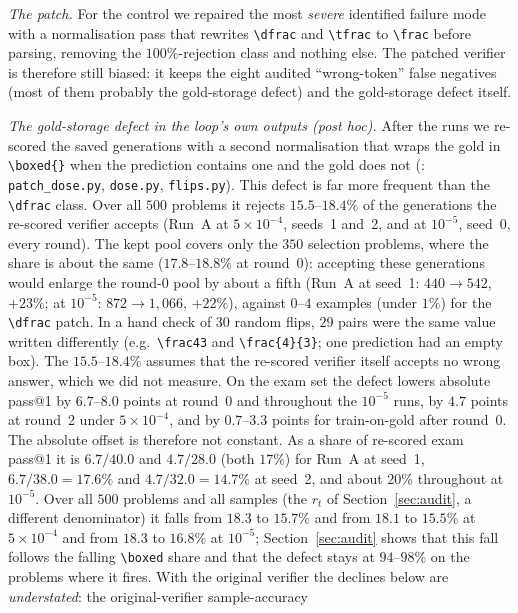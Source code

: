 \documentclass[runningheads]{llncs}
\begin{document}
\emph{The patch.} For the control we repaired the most \emph{severe} identified
failure mode with a normalisation pass that rewrites \verb|\dfrac| and
\verb|\tfrac| to \verb|\frac| before parsing, removing the $100\%$-rejection class
and nothing else. The patched verifier is therefore still biased: it keeps the
eight audited ``wrong-token'' false negatives (most of them probably the
gold-storage defect) and the gold-storage defect itself.

\emph{The gold-storage defect in the loop's own outputs (post hoc).} After the runs we
re-scored the saved generations with a second normalisation that wraps the gold
in \verb|\boxed{}| when the prediction contains one and the gold does not
(: \texttt{patch\_dose.py},
\texttt{dose.py}, \texttt{flips.py}). This defect is far more frequent than the \verb|\dfrac|
class. Over all $500$ problems it rejects $15.5$--$18.4\%$ of the generations
the re-scored verifier accepts (Run~A at $5\times10^{-4}$, seeds~1 and~2, and
at $10^{-5}$, seed~0, every round). The kept pool covers only the $350$
selection problems, where the share is about the same ($17.8$--$18.8\%$ at round~0): accepting these
generations would enlarge the round-0 pool by about a fifth (Run~A at seed~1:
$440\to542$, $+23\%$; at $10^{-5}$: $872\to1{,}066$, $+22\%$), against $0$--$4$
examples (under $1\%$) for the \verb|\dfrac| patch. In a hand
check of $30$ random flips, $29$ pairs were the same value written differently
(e.g.\ \verb|\frac43| and \verb|\frac{4}{3}|; one prediction had an empty box).
The $15.5$--$18.4\%$ assumes that the re-scored verifier itself accepts no wrong
answer, which we did not measure. On the exam set the defect lowers absolute
pass@1 by $6.7$--$8.0$ points at round~0 and throughout the $10^{-5}$ runs, by
$4.7$ points at round~2 under $5\times10^{-4}$, and by $0.7$--$3.3$ points for
train-on-gold after round~0. The absolute offset is therefore not constant. As
a share of re-scored exam pass@1 it is $6.7/40.0$ and $4.7/28.0$ (both $17\%$)
for Run~A at seed~1, $6.7/38.0=17.6\%$ and $4.7/32.0=14.7\%$ at seed~2, and
about $20\%$ throughout at $10^{-5}$. Over all $500$ problems and all samples
(the $r_t$ of Section~\ref{sec:audit}, a different denominator) it falls from
$18.3$ to $15.7\%$ and from $18.1$ to $15.5\%$ at $5\times10^{-4}$ and from
$18.3$ to $16.8\%$ at $10^{-5}$; Section~\ref{sec:audit} shows that this fall
follows the falling \verb|\boxed| share and that the defect stays at
$94$--$98\%$ on the problems where it fires. With the original verifier the
declines below are \emph{understated}: the original-verifier sample-accuracy
\end{document}
